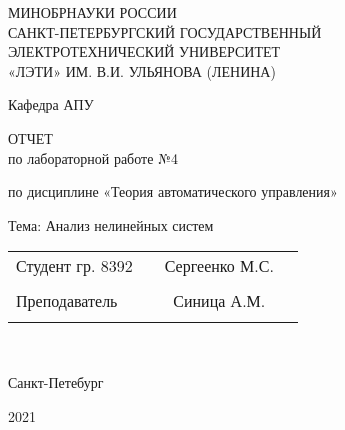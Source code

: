 \begin{titlepage}
\begin{center}
\large
МИНОБРНАУКИ РОССИИ \\
САНКТ-ПЕТЕРБУРГСКИЙ ГОСУДАРСТВЕННЫЙ \\
ЭЛЕКТРОТЕХНИЧЕСКИЙ УНИВЕРСИТЕТ \\
«ЛЭТИ» ИМ. В.И. УЛЬЯНОВА (ЛЕНИНА) \\

\vspace{0.25cm}

Кафедра АПУ


\vfill
\vfill

\textsc{ОТЧЕТ}\\
по лабораторной работе №4

по дисциплине «Теория автоматического управления»

Тема: Анализ нелинейных систем
\vfill
\vfill

\normalsize{ 
	\begin{tabular}{p{7.67cm} p{4.7cm} cp{5cm}}
		Студент гр. 8392 & \underline{\hspace{4.6cm}} & Сергеенко М.С. \\\\
		Преподаватель & \underline{\hspace{4.6cm}} & Синица А.М. \\\\
	\end{tabular}
}\\
\vfill

	Санкт-Петебург
	
	2021
\end{center}
\end{titlepage}
